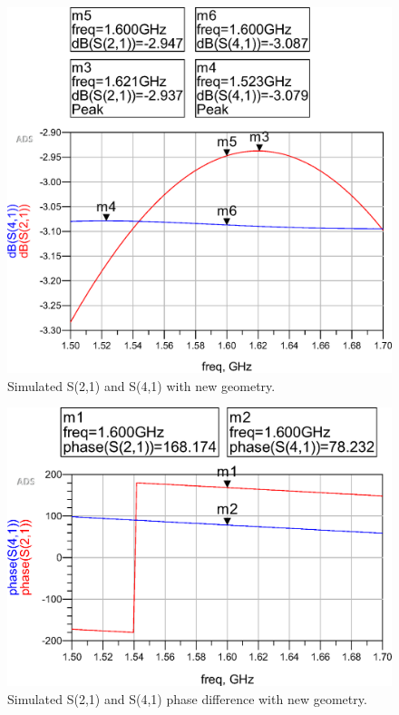 \begin{figure}[h t b p]
	\centering
	\includegraphics[width=\textwidth,keepaspectratio]{figures/big_sim_41_21.eps}
	\caption{Simulated S(2,1) and S(4,1) with new geometry.}
	\label{fig:big-sim-41-21}
\end{figure}

\begin{figure}[h t b p]
	\centering
	\includegraphics[width=\textwidth,keepaspectratio]{figures/big_sim_phase.eps}
	\caption{Simulated S(2,1) and S(4,1) phase difference with new geometry.}
	\label{fig:big-sim-phase}
\end{figure}

